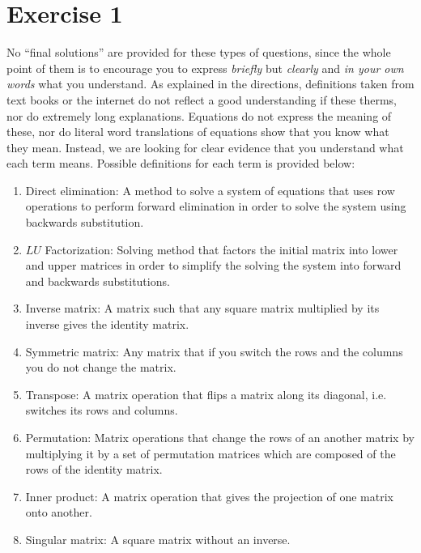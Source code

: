 \section{Exercise 1}
No ``final solutions'' are provided for these types of questions, since the
whole point of them is to encourage you to express \emph{briefly} but
\emph{clearly} and \emph{in your own words} what you understand. As
explained in the directions, definitions taken from text books or the
internet do not reflect a good understanding if these therms, nor do
extremely long explanations. Equations do not express the meaning of these,
nor do literal word translations of equations show that you know what they
mean. Instead, we are looking for clear evidence that you understand what
each term means. Possible definitions for each term is provided below: 
\begin{enumerate}[label=(\alph*)]
    \item Direct elimination: A method to solve a system of equations that
        uses row operations to perform forward elimination  in order to
        solve the system using backwards substitution.

    \item $LU$ Factorization: Solving method that factors the initial
        matrix into lower and upper matrices in order to simplify the
        solving the system into forward and backwards substitutions.

    \item Inverse matrix: A matrix such that any square matrix multiplied
        by its inverse gives the identity matrix.
        
    \item Symmetric matrix: Any matrix that if you switch the rows and the
        columns you do not change the matrix.

    \item Transpose: A matrix operation that  flips a matrix along its
        diagonal, i.e. switches its rows and columns.
        
    \item Permutation: Matrix operations that change the rows of an another
        matrix by multiplying it by a set of permutation matrices which are
        composed of the rows of the identity matrix. 

    \item Inner product: A matrix operation that gives the projection of
        one matrix onto another.  

    \item Singular matrix: A square matrix without an inverse.

\end{enumerate}

